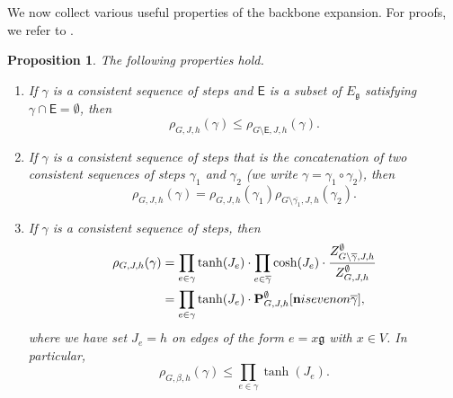 \documentclass[10pt,a4paper]{amsart}
\numberwithin{equation}{section}
\newtheorem{Prop}[Thm]{Proposition}
\newcommand\n{\mathbf{n}}
\newcommand\fg{\mathfrak{g}}
\begin{document}
We now collect various useful properties of the backbone expansion. For proofs, we refer to \cite[Proposition~4.4]{AizenmanFernandezCriticalBehaviorMagnetization1986}. 

\begin{Prop}The following properties hold.
\label{prop:backbone}
\begin{enumerate}
	\item[$\bullet$] If $\gamma$ is a consistent sequence of steps and $\mathsf E$ is a subset of $E_\fg$ satisfying $\gamma\cap \mathsf E=\emptyset$, then
	\begin{equation}\label{eq:propbackb1}
		\rho_{G,J,h}(\gamma)\leq \rho_{G\setminus\mathsf E,J,h}(\gamma).
	\end{equation}
	\item[$\bullet$] If $\gamma$ is a consistent sequence of steps that is the concatenation of two consistent sequences of steps $\gamma_1$ and $\gamma_2$ (we write $\gamma=\gamma_1\circ \gamma_2)$, then
	\begin{equation}\label{eq:propbackb2}
		\rho_{G,J,h}(\gamma)=\rho_{G,J,h}(\gamma_1)\rho_{G\setminus \overline{\gamma_1},J,h}(\gamma_2).
	\end{equation}
	\item[$\bullet$] If $\gamma$ is a consistent sequence of steps, then
	\begin{align}\label{eq:formula backbone weight}
	\begin{aligned}	
		\rho_{G,J,h}(\gamma)&=\prod_{e\in \gamma}\tanh(J_e)\cdot\prod_{e\in \overline{\gamma}}\cosh(J_e)\cdot\frac{Z_{G\setminus \overline{\gamma},J,h}^\emptyset}{Z_{G,J,h}^\emptyset}\\&=\prod_{e\in \gamma}\tanh(J_e)\cdot\mathbf P^{\emptyset}_{G,J,h}[\n \textup{ is even on }\overline{\gamma}],
		\end{aligned}
	\end{align}
	where we have set $J_e=h$ on edges of the form $e=x\fg$ with $x\in V$. In particular, 
	\begin{equation}
	\rho_{G,\beta,h}(\gamma)\leq \prod_{e\in \gamma}\tanh(J_e).
	\end{equation} 
\end{enumerate}
\end{Prop}
\end{document}
